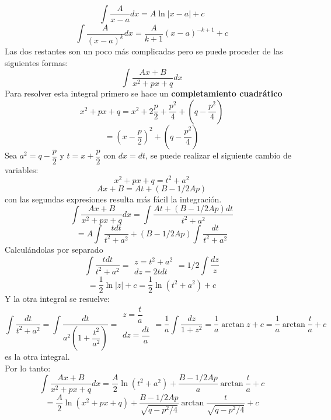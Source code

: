 \documentclass[10pt,twoside]{SelfArx} %
\begin{document}
   \begin{equation}
 	\displaystyle\int \dfrac{A}{x-a}dx=A\ln|x-a|+c
 	\end{equation}
 	\begin{equation}
 	\displaystyle\int \dfrac{A}{(x-a)^{k}}dx =\dfrac{A}{k+1}(x-a)^{-k+1}+c
 	\end{equation}
 Las dos restantes son un poco más complicadas pero se puede proceder de las siguientes formas:	
\begin{equation}
\displaystyle\int\dfrac{Ax+B}{x^{2}+px+q}dx  
\end{equation}
Para resolver esta integral primero se hace un \textbf{completamiento cuadrático}
\[ x^{2}+px+q=x^{2}+2\dfrac{p}{2}+\dfrac{p^{2}}{4}+\left (q-\dfrac{p^{2}}{4}\right ) \]
\[ =(x-\dfrac{p}{2})^{2}+(q-\dfrac{p^{2}}{4}) \]
Sea $ a^{2}=q-\dfrac{p}{2} $ y $ t=x+\dfrac{p}{2} $ con $ dx=dt $, se puede realizar el siguiente cambio de variables:
\[ x^{2}+px+q=t^{2}+a^{2} \]
\[ Ax+B=At+(B-1/2Ap) \]
con las segundas expresiones resulta más fácil la integración.
\begin{equation}
	\int \dfrac{Ax+B}{x^{2}+px+q}dx=\int \dfrac{At+(B-1/2Ap)dt}{t^{2}+a^{2}}
\end{equation}
\begin{equation}
=A\int \dfrac{tdt}{t^{2}+a^{2}}+ (B-1/2Ap)\int\dfrac{dt}{t^{2}+a^{2}}
\end{equation}
Calcul\'andolas por separado
\[ \int \dfrac{tdt}{t^{2}+a^{2}}=  \begin{array}{cc}
z=t^{2}+a^{2}\\
dz=2tdt
\end{array} 
= 1/2\int\dfrac{dz}{z}\]
\[ =\dfrac{1}{2}\ln |z|+c=\dfrac{1}{2}\ln (t^{2}+a^{2})+c \]
Y la otra integral se resuelve:
\[ \int\dfrac{dt}{t^{2}+a^{2}}=\int \dfrac{dt}{a^{2}\left (1+\dfrac{t^{2}}{a^{2}}\right )}=\begin{array}{cc}
z=\dfrac{t}{a}\\
dz=\dfrac{dt}{a}
\end{array}=\dfrac{1}{a}\int \dfrac{dz}{1+z^{2}}=\dfrac{1}{a}\arctan z+c=\dfrac{1}{a}\arctan \dfrac{t}{a}+c  \]
es la otra integral.\\
Por lo tanto:
\begin{equation}
\int \dfrac{Ax+B}{x^{2}+px+q}dx=\dfrac{A}{2}\ln (t^{2}+a^{2})+\dfrac{B-1/2Ap}{a}\arctan \dfrac{t}{a}+c
\end{equation}
\begin{equation}
=\dfrac{A}{2}\ln (x^{2}+px+q)+\dfrac{B-1/2Ap}{\sqrt{q-p^{2}/4}}\arctan \dfrac{t}{\sqrt{q-p^{2}/4}}+c
\end{equation}
\end{document}
